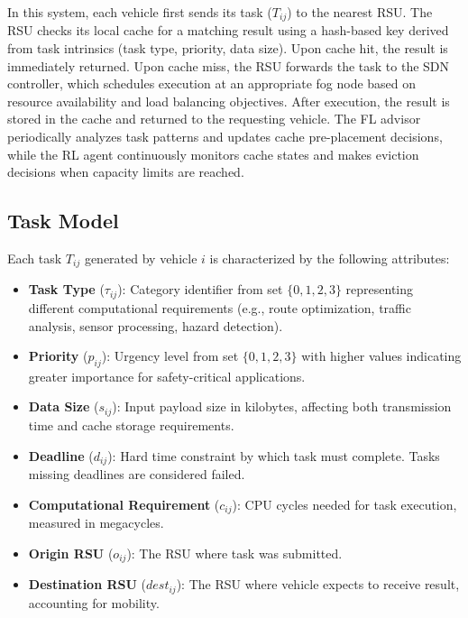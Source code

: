 In this system, each vehicle first sends its task ($T_{ij}$) to the nearest RSU. The RSU checks its local cache for a matching result using a hash-based key derived from task intrinsics (task type, priority, data size). Upon cache hit, the result is immediately returned. Upon cache miss, the RSU forwards the task to the SDN controller, which schedules execution at an appropriate fog node based on resource availability and load balancing objectives. After execution, the result is stored in the cache and returned to the requesting vehicle. The FL advisor periodically analyzes task patterns and updates cache pre-placement decisions, while the RL agent continuously monitors cache states and makes eviction decisions when capacity limits are reached.

\subsection{Task Model}

Each task $T_{ij}$ generated by vehicle $i$ is characterized by the following attributes:

\begin{itemize}
    \item \textbf{Task Type} ($\tau_{ij}$): Category identifier from set $\{0, 1, 2, 3\}$ representing different computational requirements (e.g., route optimization, traffic analysis, sensor processing, hazard detection).
    
    \item \textbf{Priority} ($p_{ij}$): Urgency level from set $\{0, 1, 2, 3\}$ with higher values indicating greater importance for safety-critical applications.
    
    \item \textbf{Data Size} ($s_{ij}$): Input payload size in kilobytes, affecting both transmission time and cache storage requirements.
    
    \item \textbf{Deadline} ($d_{ij}$): Hard time constraint by which task must complete. Tasks missing deadlines are considered failed.
    
    \item \textbf{Computational Requirement} ($c_{ij}$): CPU cycles needed for task execution, measured in megacycles.
    
    \item \textbf{Origin RSU} ($o_{ij}$): The RSU where task was submitted.
    
    \item \textbf{Destination RSU} ($dest_{ij}$): The RSU where vehicle expects to receive result, accounting for mobility.
\end{itemize}

